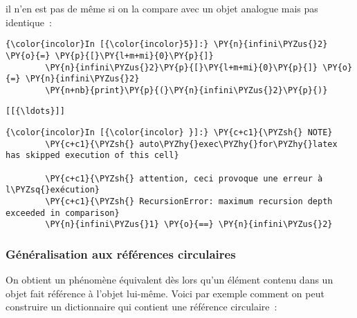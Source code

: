     il n'en est pas de même si on la compare avec un objet analogue mais pas
identique~:

    \begin{Verbatim}[commandchars=\\\{\},frame=single,framerule=0.3mm,rulecolor=\color{cellframecolor}]
{\color{incolor}In [{\color{incolor}5}]:} \PY{n}{infini\PYZus{}2} \PY{o}{=} \PY{p}{[}\PY{l+m+mi}{0}\PY{p}{]}
        \PY{n}{infini\PYZus{}2}\PY{p}{[}\PY{l+m+mi}{0}\PY{p}{]} \PY{o}{=} \PY{n}{infini\PYZus{}2}
        \PY{n+nb}{print}\PY{p}{(}\PY{n}{infini\PYZus{}2}\PY{p}{)}
\end{Verbatim}


    \begin{Verbatim}[commandchars=\\\{\},frame=single,framerule=0.3mm,rulecolor=\color{cellframecolor}]
[[{\ldots}]]
\end{Verbatim}

    \begin{Verbatim}[commandchars=\\\{\},frame=single,framerule=0.3mm,rulecolor=\color{cellframecolor}]
{\color{incolor}In [{\color{incolor} }]:} \PY{c+c1}{\PYZsh{} NOTE}
        \PY{c+c1}{\PYZsh{} auto\PYZhy{}exec\PYZhy{}for\PYZhy{}latex has skipped execution of this cell}
        
        \PY{c+c1}{\PYZsh{} attention, ceci provoque une erreur à l\PYZsq{}exécution}
        \PY{c+c1}{\PYZsh{} RecursionError: maximum recursion depth exceeded in comparison}
        \PY{n}{infini\PYZus{}1} \PY{o}{==} \PY{n}{infini\PYZus{}2}
\end{Verbatim}


    \hypertarget{guxe9nuxe9ralisation-aux-ruxe9fuxe9rences-circulaires}{%
\subsubsection{Généralisation aux références
circulaires}\label{guxe9nuxe9ralisation-aux-ruxe9fuxe9rences-circulaires}}

    On obtient un phénomène équivalent dès lors qu'un élément contenu dans
un objet fait référence à l'objet lui-même. Voici par exemple comment on
peut construire un dictionnaire qui contient une référence circulaire~:

